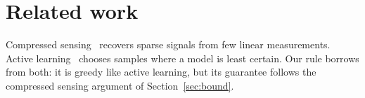 \section{Related work}\label{sec:related}
Compressed sensing~\cite{candes2006,donoho2006} recovers sparse signals from
few linear measurements. Active learning~\cite{settles2009} chooses samples
where a model is least certain. Our rule borrows from both: it is greedy like
active learning, but its guarantee follows the compressed sensing argument of
Section~\ref{sec:bound}.
